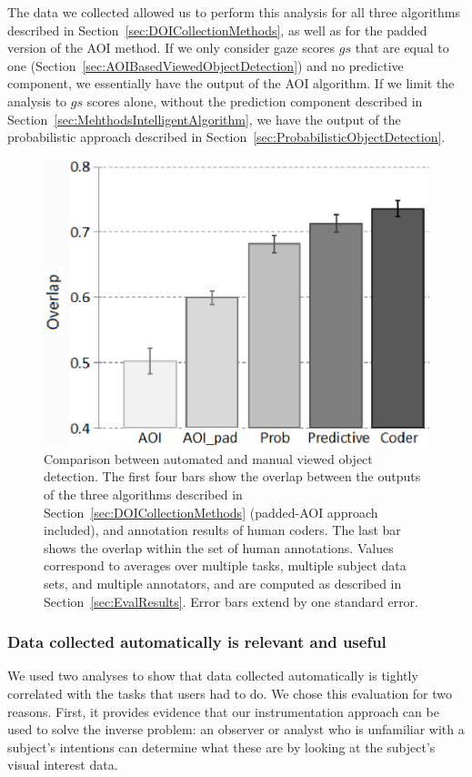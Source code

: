 The data we collected allowed us to perform this analysis for all three algorithms described in Section~\ref{sec:DOICollectionMethods}, as well as for the padded version of the AOI method. If we only consider gaze scores $gs$ that are equal to one (Section~\ref{sec:AOIBasedViewedObjectDetection}) and no predictive component, we essentially have the output of the AOI algorithm. If we limit the analysis to $gs$ scores alone, without the prediction component described in Section~\ref{sec:MehthodsIntelligentAlgorithm}, we have the output of the probabilistic approach described in Section~\ref{sec:ProbabilisticObjectDetection}.

\begin{figure}[htb]
  \centering
  \includegraphics[width=0.8\linewidth]{images/algosComparison.eps}
  \caption{Comparison between automated and manual viewed object detection.
The first four bars show the overlap between the outputs of
the three algorithms described in Section~\ref{sec:DOICollectionMethods} (padded-AOI approach included), and
annotation results of human coders. The last bar shows the overlap
within the set of human annotations. Values correspond to averages
over multiple tasks, multiple subject data sets, and multiple annotators,
and are computed as described in Section~\ref{sec:EvalResults}. Error bars
extend by one standard error. }
	\label{fig:quantitative}
\end{figure}


\subsubsection{Data collected automatically is relevant and useful}
\label{sec:EvalDataCollected}

We used two analyses to show that data collected automatically is tightly correlated with the tasks that users had to do. We chose this evaluation for two reasons. First, it provides evidence that our instrumentation approach can be used to solve the inverse problem: an observer or analyst who is unfamiliar with a subject's intentions can determine what these are by looking at the subject's visual interest data. 


